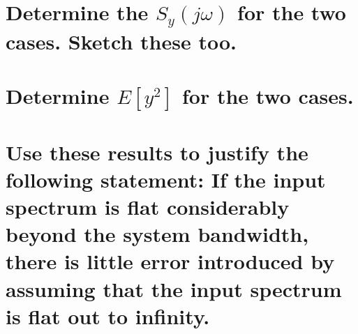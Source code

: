 \documentclass[12pt,letterpaper, onecolumn]{exam}
\begin{document}
\begin{questions}
\begin{parts}
        \clearpage
        \part{Determine the $S_y(j\omega)$ for the two cases. Sketch these too.}

        \solution{%

        }

        \part{Determine $E[y^2]$ for the two cases.}


        \part{Use these results to justify the following statement:
            If the input spectrum is flat considerably beyond the system bandwidth, there is little error introduced by assuming that the input spectrum is flat out to infinity.
        }


\end{parts}
\end{questions}
\end{document}
